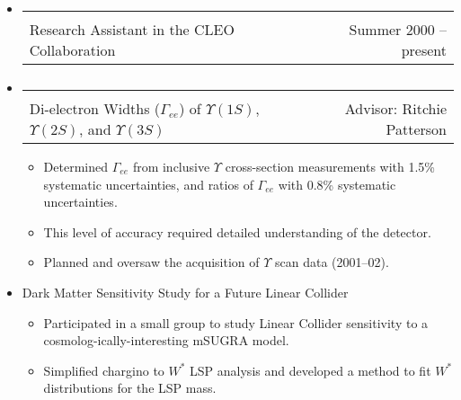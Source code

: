\documentclass[12pt]{article}
\begin{document}
\begin{itemize}

  \item \hspace{-0.3 cm} \begin{tabular}{l r} \mbox{\hspace{0.65\linewidth}} & \mbox{\hspace{0.315\linewidth}} \vspace{-0.4 cm} \\
Research Assistant in the CLEO Collaboration & Summer 2000 -- present \end{tabular}

  \item \hspace{-0.3 cm} \begin{tabular}{l r} \mbox{\hspace{0.65\linewidth}} & \mbox{\hspace{0.315\linewidth}} \vspace{-0.4 cm} \\
Di-electron Widths ($\Gamma_{ee}$) of $\Upsilon(1S)$, $\Upsilon(2S)$, and $\Upsilon(3S)$ & Advisor: Ritchie Patterson \end{tabular}

\begin{itemize}

  \item Determined $\Gamma_{ee}$ from inclusive $\Upsilon$
    cross-section measurements with 1.5\% systematic uncertainties,
    and ratios of $\Gamma_{ee}$ with 0.8\% systematic uncertainties.

  \item This level of accuracy required detailed understanding of the
    detector.

  \item Planned and oversaw the acquisition of $\Upsilon$ scan data
    (2001--02).

\end{itemize}

  \item Dark Matter Sensitivity Study for a Future Linear Collider

\begin{itemize}

  \item Participated in a small group to study Linear Collider
  sensitivity to a cosmolog-ically-interesting mSUGRA model.

  \item Simplified chargino to $W^*$ LSP analysis and developed a
  method to fit $W^*$ distributions for the LSP mass.


\end{itemize}
\end{itemize}
\end{document}
